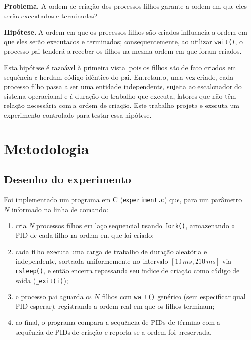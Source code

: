 \documentclass[conference]{IEEEtran}
\begin{document}
\textbf{Problema.} A ordem de criação dos processos filhos garante a ordem
em que eles serão executados e terminados?

\textbf{Hipótese.} A ordem em que os processos filhos são criados influencia
a ordem em que eles serão executados e terminados; consequentemente, ao
utilizar \texttt{wait()}, o processo pai tenderá a receber os filhos na
mesma ordem em que foram criados.

Esta hipótese é razoável à primeira vista, pois os filhos são de fato criados
em sequência e herdam código idêntico do pai. Entretanto, uma vez criado, cada
processo filho passa a ser uma entidade independente, sujeita ao escalonador
do sistema operacional e à duração do trabalho que executa, fatores que não
têm relação necessária com a ordem de criação. Este trabalho projeta e executa
um experimento controlado para testar essa hipótese.

\section{Metodologia}

\subsection{Desenho do experimento}

Foi implementado um programa em C (\texttt{experiment.c}) que, para um
parâmetro $N$ informado na linha de comando:

\begin{enumerate}
  \item cria $N$ processos filhos em laço sequencial usando \texttt{fork()},
        armazenando o PID de cada filho na ordem em que foi criado;
  \item cada filho executa uma carga de trabalho de duração aleatória e
        independente, sorteada uniformemente no intervalo $[10\,ms, 210\,ms]$
        via \texttt{usleep()}, e então encerra repassando seu índice de
        criação como código de saída (\texttt{\_exit(i)});
  \item o processo pai aguarda os $N$ filhos com \texttt{wait()} genérico
        (sem especificar qual PID esperar), registrando a ordem real em que
        os filhos terminam;
  \item ao final, o programa compara a sequência de PIDs de término com a
        sequência de PIDs de criação e reporta se a ordem foi preservada.
\end{enumerate}
\end{document}
